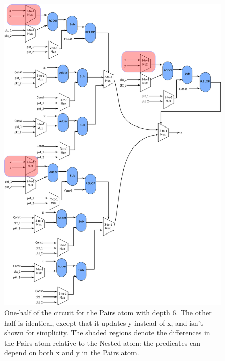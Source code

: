 \newpage
\begin{figure}[!htbp]
  \includegraphics[width=\textwidth]{pairs.pdf}
  \caption{One-half of the circuit for the Pairs atom with depth 6. The other
  half is identical, except that it updates y instead of x, and isn't shown for
simplicity. The shaded regions denote the differences in the Pairs atom
relative to the Nested atom: the predicates can depend on both x and y in the Pairs
atom.}
\label{fig:pairs}
\end{figure}
